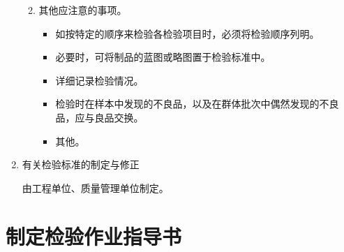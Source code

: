 \begin{enumerate}
\begin{enumerate}
\begin{itemize}
                \end{itemize}
            \item 其他应注意的事项。

                \begin{itemize}
                    \item 如按特定的顺序来检验各检验项目时，必须将检验顺序列明。

                    \item 必要时，可将制品的蓝图或略图置于检验标准中。

                    \item 详细记录检验情况。

                    \item 检验时在样本中发现的不良品，以及在群体批次中偶然发现的不良品，应与良品交换。

                    \item 其他。
                \end{itemize}

            \end{enumerate}

    \item 有关检验标准的制定与修正

        由工程单位、质量管理单位制定。

    \end{enumerate}

\section {制定检验作业指导书}

